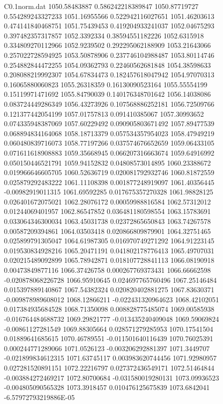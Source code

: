 \begin{filecontents}{C0.1norm.dat}
1050.58483887		0.586242218389847
1050.87719727		0.554289243327233
1051.16955566		0.522942116027651
1051.46203613		0.474141840468751
1051.75439453		0.419204933241037
1052.04675293		0.397482357317857
1052.3392334		0.38594551182226
1052.6315918		0.334809270112966
1052.9239502		0.292295062188909
1053.21643066		0.257022728594925
1053.50878906		0.237746104988487
1053.80114746		0.254882844472255
1054.09362793		0.22460562681848
1054.38598633		0.208088219992307
1054.67834473		0.182457618047942
1054.97070313		0.16065880060823
1055.26318359		0.16130090523164
1055.55554199		0.15119971471692
1055.84790039		0.140176348701642
1056.14038086		0.083724449286349
1056.43273926		0.107568886252181
1056.72509766		0.121377442054199
1057.01757813		0.091410385067
1057.30993652		0.074335948387069
1057.60229492		0.090905803671492
1057.89477539		0.068894834164068
1058.18713379		0.057534357954023
1058.47949219		0.060480839716073
1058.77197266		0.037574676652659
1059.06433105		0.071611618908883
1059.35668945		0.066207316663674
1059.64916992		0.050150446521791
1059.94152832		0.04808573014895
1060.23388672		0.019966646605705
1060.52636719		0.020081792932746
1060.81872559		0.025879292483222
1061.11108398		0.001877248919097
1061.40356445		-0.00982919011315
1061.69592285		0.017675357270328
1061.98828125		0.026401672075021
1062.28076172		0.00059988816584
1062.57312012		0.01244069401957
1062.86547852		0.036481180598554
1063.15783691		0.033064346300034
1063.45031738		0.02372865650843
1063.74267578		0.00587209394861
1064.03503418		0.020866809879901
1064.32751465		0.025899791305047
1064.61987305		0.016970749271292
1064.91223145		0.019530834928216
1065.20471191		0.041802178776413
1065.49707031		0.020215489092899
1065.78942871		0.018107728841113
1066.08190918		0.00473849877116
1066.37426758		0.000267769373431
1066.66662598		-0.020878068226728
1066.95910645		0.024697765760496
1067.25146484		0.015397889140867
1067.54382324		0.020820402881275
1067.83630371		-0.009878989608012
1068.12866211		-0.022431320964623
1068.42102051		0.017384935684528
1068.71350098		0.008828775485074
1069.00585938		-0.016764484688732
1069.29821777		-0.013435240409048
1069.59069824		-0.00861127281549
1069.88305664		0.028571279285953
1070.17541504		0.01889641685615
1070.46789551		-0.011501640116439
1070.76025391		0.000244771289066
1071.0526123		-0.003206292881397
1071.3449707		-0.021899834612315
1071.63745117		0.003983620744456
1071.92980957		0.027281520891151
1072.22216797		0.027372436549171
1072.51464844		-0.003884272469217
1072.80700684		-0.031580019280131
1073.09936523		-0.004805090565328
1073.3918457		0.010476125675839
1073.6842041		-6.57972793219886E-05

\end{filecontents}
